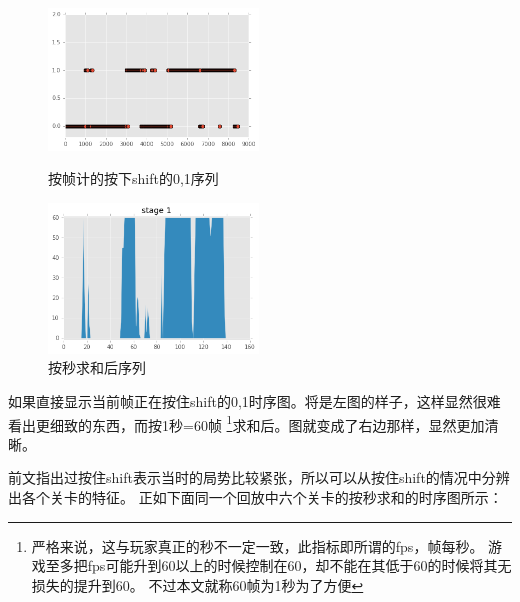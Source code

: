 \documentclass[UTF8]{ctexart}
\begin{document}
\begin{figure}[H]
\begin{minipage}[t]{0.5\linewidth}
\centering
\includegraphics[width=2.2in]{images/pressingShiftFrame.png}
\caption{按帧计的按下shift的0,1序列}
\end{minipage}%
\begin{minipage}[t]{0.5\linewidth}
\centering
\includegraphics[width=2.2in]{images/pressingShift1.png}
\caption{按秒求和后序列}
\end{minipage}
\end{figure}

如果直接显示当前帧正在按住shift的0,1时序图。将是左图的样子，这样显然很难看出更细致的东西，而按1秒=60帧
\footnote{严格来说，这与玩家真正的秒不一定一致，此指标即所谓的fps，帧每秒。
游戏至多把fps可能升到60以上的时候控制在60，却不能在其低于60的时候将其无损失的提升到60。
不过本文就称60帧为1秒为了方便 }求和后。图就变成了右边那样，显然更加清晰。

前文指出过按住shift表示当时的局势比较紧张，所以可以从按住shift的情况中分辨出各个关卡的特征。
正如下面同一个回放中六个关卡的按秒求和的时序图所示：
\end{document}
